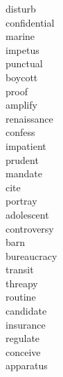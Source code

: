 \documentclass[a4paper, 10pt]{ctexart}
\begin{document}
\begin{multicols*}{2}
\begin{description}
\item[disturb]

\item[confidential]

\item[marine]

\item[impetus]

\item[punctual]

\item[boycott]

\item[proof]

\item[amplify]

\item[renaissance]

\item[confess]

\item[impatient]

\item[prudent]

\item[mandate]

\item[cite]

\item[portray]

\item[adolescent]

\item[controversy]

\item[barn]

\item[bureaucracy]

\item[transit]

\item[threapy]

\item[routine]

\item[candidate]

\item[insurance]

\item[regulate]

\item[conceive]

\item[apparatus]


\end{description}
\end{multicols*}
\end{document}
